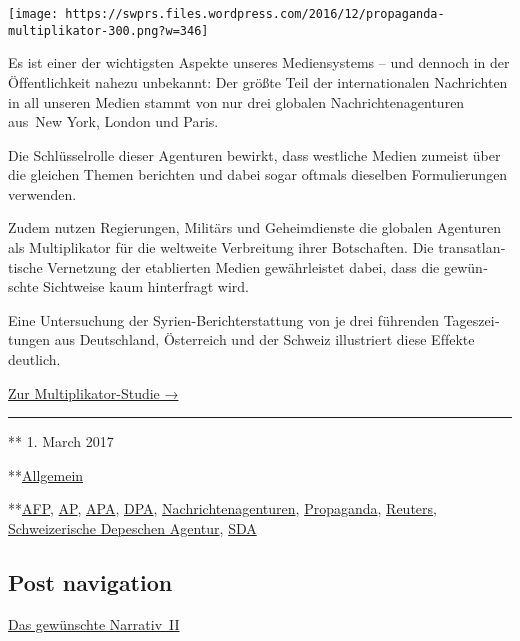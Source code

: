 \texttt{[image: https://swprs.files.wordpress.com/2016/12/propaganda-multiplikator-300.png?w=346]}

Es ist einer der wichtigsten Aspekte unseres Medien­systems -- und
dennoch in der Öf‌fent­lich­keit nahezu unbekannt: Der größte Teil der
inter­na­tio­nalen Nach­rich­ten in all unseren Medien stammt von nur
drei glo­balen Nach­rich­ten­agen­turen aus~New York, London und Paris.

Die Schlüssel­rolle dieser Agen­turen be­wirkt, dass west­liche Medien
zu­meist über die glei­chen The­men be­richten und dabei sogar oftmals
dieselben For­mu­lie­rungen ver­wenden.

Zu­dem nutzen Re­gie­rungen, Mi­li­tärs und Ge­heim­dienste die
glo­balen Agen­turen als Mul­ti­pli­kator für die welt­weite
Ver­brei­tung ihrer Bot­schaf‌ten. Die trans­at­lan­tische Ver­netzung
der eta­blier­ten Medien ge­währ­leis­tet da­bei, dass die ge­wün­schte
Sicht­weise kaum hin­ter­fragt wird.

Eine Unter­suchung der Syrien-Bericht­er­stat­tung von je drei
füh­ren­den Tages­zei­tungen aus Deutsch­land, Öster­reich und der
Schweiz illus­triert diese Ef‌fekte deutlich.

\href{https://swprs.org/der-propaganda-multiplikator/}{Zur
Multiplikator-Studie →}

\begin{center}\rule{0.5\linewidth}{\linethickness}\end{center}

** 1. March 2017

**\href{https://swprs.org/category/allgemein/}{Allgemein}

**\href{https://swprs.org/tag/afp/}{AFP},
\href{https://swprs.org/tag/ap/}{AP},
\href{https://swprs.org/tag/apa/}{APA},
\href{https://swprs.org/tag/dpa/}{DPA},
\href{https://swprs.org/tag/nachrichtenagenturen/}{Nachrichtenagenturen},
\href{https://swprs.org/tag/propaganda/}{Propaganda},
\href{https://swprs.org/tag/reuters/}{Reuters},
\href{https://swprs.org/tag/schweizerische-depeschen-agentur/}{Schweizerische
Depeschen Agentur}, \href{https://swprs.org/tag/sda/}{SDA}

\hypertarget{post-navigation}{%
\subsection{Post navigation}\label{post-navigation}}

\href{https://swprs.org/2017/03/01/das-gewuenschte-narrativ-ii/}{Das
gewünschte Narrativ~II}

